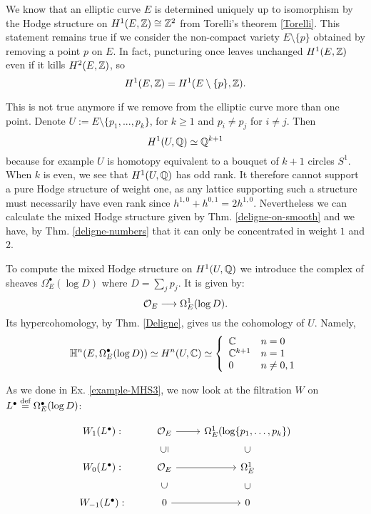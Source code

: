 \documentclass[../main.tex]{subfiles}
\begin{document}
\begin{es}  \label{puncturedellipticex}

We know that an elliptic curve $E$ is determined uniquely up to isomorphism by the Hodge structure on $H^1(E,\mathbb{Z})\cong \mathbb{Z}^2$ from Torelli's theorem \ref{Torelli}. This statement remains true if we consider the non-compact variety $E\setminus \{p\}$ obtained by removing a point $p$ on $E$. In fact, puncturing once leaves unchanged $H^1(E,\mathbb{Z})$ even if it kills $H^2(E,\mathbb{Z})$, so 
\[H^1(E,\mathbb{Z}) = H^1(E\setminus\{p\},\mathbb{Z}).\] 

This is not true anymore if we remove from the elliptic curve more than one point. Denote $U := E\setminus\{p_1,...,p_k\}$, for $k \geq 1$ and $p_i \neq p_j$ for $i \neq j$. Then
\[H^1(U,\mathbb{Q})\simeq \mathbb{Q}^{k+1}\]
because for example $U$ is homotopy equivalent to a bouquet of $k+1$ circles $S^1$.
When $k$ is even, we see that $H^1(U,\mathbb{Q})$ has odd rank. It therefore cannot support a pure Hodge structure of weight one, as any lattice supporting such a structure must necessarily have even rank since $h^{1,0}+h^{0,1} = 2h^{1,0}$.
Nevertheless we can calculate the mixed Hodge structure given by Thm. \ref{deligne-on-smooth} and we have, by Thm. \ref{deligne-numbers} that it can only be concentrated in weight $1$ and $2$.


To compute the mixed Hodge structure on $H^1(U,\mathbb{Q})$ we introduce the complex of sheaves $\Omega^\bullet_E( \log D)$ where $D=\sum_j p_j$. It is given by:
\[
\mathcal{O}_E \longrightarrow \Omega^1_E( \log D).
\]
Its hypercohomology, by Thm. \ref{Deligne}, gives us the cohomology of $U$. Namely,
\begin{align*}
    \mathbb{H}^n(E,\Omega^\bullet_E( \log D))\simeq H^n(U,\mathbb{C}) \simeq \left\{\begin{array}{ll} \mathbb{C} & n=0 \\ \mathbb{C}^{k+1} & n=1 \\  0& n \neq 0,1\end{array}\right. 
\end{align*}



As we done in Ex. \ref{example-MHS3}, we now look at the filtration $W$ on $L^\bullet \stackrel{\text{def}}{=} \Omega^\bullet_E( \log D)$:

\[
\begin{tikzcd} %
W_{1}(L^\bullet) : & \calO_{E}\arrow[r] & \Omega^1_{E}(\log\{p_1,\ldots,p_k\})\\
W_{0}(L^\bullet) : & \calO_{E}\arrow[r] \arrow[u, phantom, sloped, "\subseteq"] & \Omega^1_{E} \arrow[u, phantom, sloped, "\subset"]\\
W_{-1}(L^\bullet) : & 0\arrow[r] \arrow[u, phantom, sloped, "\subset"] & 0 \arrow[u, phantom, sloped, "\subset"]\\
\end{tikzcd}
\]


\end{es}
\end{document}
